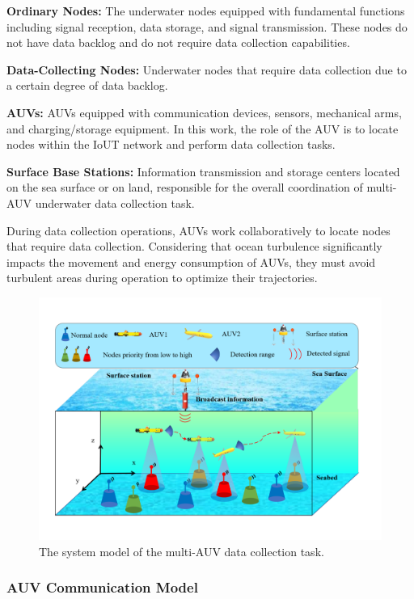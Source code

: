 \documentclass{article}
\begin{document}
\textbf{Ordinary Nodes:} The underwater nodes equipped with fundamental functions including signal reception, data storage, and signal transmission. These nodes do not have data backlog and do not require data collection capabilities.

\textbf{Data-Collecting Nodes:} Underwater nodes that require data collection due to a certain degree of data backlog.

\textbf{AUVs:} AUVs equipped with communication devices, sensors, mechanical arms, and charging/storage equipment. In this work, the role of the AUV is to locate nodes within the IoUT network and perform data collection tasks.

\textbf{Surface Base Stations:} Information transmission and storage centers located on the sea surface or on land, responsible for the overall coordination of multi-AUV underwater data collection task.


During data collection operations, AUVs work collaboratively to locate nodes that require data collection. Considering that ocean turbulence significantly impacts the movement and energy consumption of AUVs, they must avoid turbulent areas during operation to optimize their trajectories.

\begin{figure}[!htb]
    \centering
    \includegraphics[width=0.788\linewidth]{system_model.pdf}
    \caption{The system model of the multi-AUV data collection task.}
    \label{1}
\end{figure}


\subsubsection{AUV Communication Model}\label{se:3.3}
\end{document}
